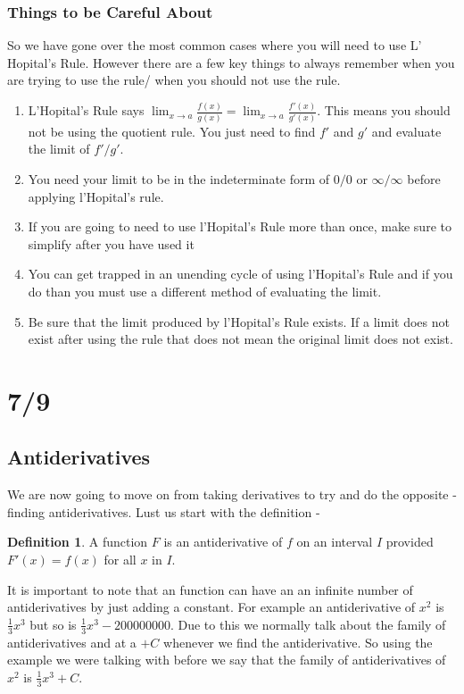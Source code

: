 \documentclass[12pt,reqno]{article}
\theoremstyle{definition}
\newtheorem*{Definition}{Definition}
\begin{document}
\subsubsection{Things to be Careful About}
So we have gone over the most common cases where you will need to use L' Hopital's Rule. However there are a few key things to always remember when you are trying to use the rule/ when you should not use the rule. 
\begin{enumerate}
		\item L'Hopital's Rule says $\lim_{x \to a} \frac{f(x)}{g(x)} = \lim_{x \to a} \frac{f'(x)}{g'(x)}$. This means you should not be using the quotient rule. You just need to find $f'$ and $g'$ and evaluate the limit of $f'/g'$. 
		\item You need your limit to be in the indeterminate form of $0/0$ or $\infty/\infty$ before applying l'Hopital's rule. 
		\item If you are going to need to use l'Hopital's Rule more than once, make sure to simplify after you have used it 
		\item You can get trapped in an unending cycle of using l'Hopital's Rule and if you do than you must use a different method of evaluating the limit. 
		\item Be sure that the limit produced by l'Hopital's Rule exists. If a limit does not exist after using the rule that does not mean the original limit does not exist. 
\end{enumerate}
\section{7/9}
\subsection{Antiderivatives} 
We are now going to move on from taking derivatives to try and do the opposite - finding antiderivatives. Lust us start with the definition -
\begin{Definition}
	A function $F$ is an antiderivative of $f$ on an interval $I$ provided $F'(x) = f(x)$ for all $x$ in $I$. 
\end{Definition}

It is important to note that an function can have an an infinite number of antiderivatives by just adding a constant. For example an antiderivative of $x^2$ is $\frac{1}{3} x^3$ but so is $\frac{1}{3} x^3 - 200000000$. Due to this we normally talk about the family of antiderivatives and at a $+C$ whenever we find the antiderivative. So using the example we were talking with before we say that the family of antiderivatives of $x^2$ is $\frac{1}{3} x^3 + C$. 
\end{document}
